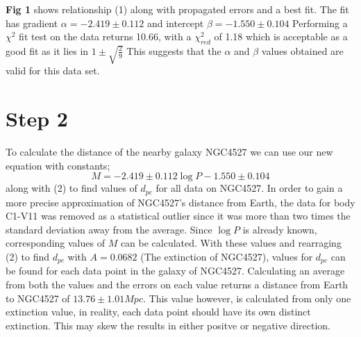 \documentclass{article}
\begin{document}
    \textbf{Fig 1} shows relationship (1) along with propagated errors and a best fit. The fit has gradient
    $\alpha = -2.419 \pm 0.112$ and intercept $\beta = -1.550 \pm 0.104$ \newpage
    Performing a $\chi^2$ fit test on the data returns 10.66, with a $\chi^2_{red}$ of  1.18 which is acceptable 
    as a good fit as it lies in $1\pm\sqrt{\frac{2}{9}}$ This suggests that the $\alpha$ and $\beta$ values obtained are valid for this data set.
    \section{Step 2}
    To calculate the distance of the nearby galaxy NGC4527 we can use our new equation with constants;
    \begin{equation}
        M = -2.419 \pm 0.112 \log P -1.550 \pm 0.104
    \end{equation}
    along with (2) to find values of $d_{pc}$ for all data on NGC4527. \newline
    In order to gain a more precise approximation of NGC4527's distance from Earth, the data for body C1-V11 was removed as a statistical outlier since it was more than two times the standard deviation away from the average. \newline
    Since $\log P$ is already known, corresponding values of $M$ can be calculated. With these values and rearraging (2) to find $d_{pc}$ with $A = 0.0682$ (The extinction of NGC4527),
    values for $d_{pc}$ can be found for each data point in the galaxy of NGC4527. \newline
    \newline
    Calculating an average from both the values and the errors on each value returns a distance from Earth to NGC4527
    of $13.76 \pm 1.01 Mpc$. \newline
    This value however, is calculated from only one extinction value, in reality, each data point should have its own distinct extinction. This may skew the results in either positve or negative direction.
\end{document}
